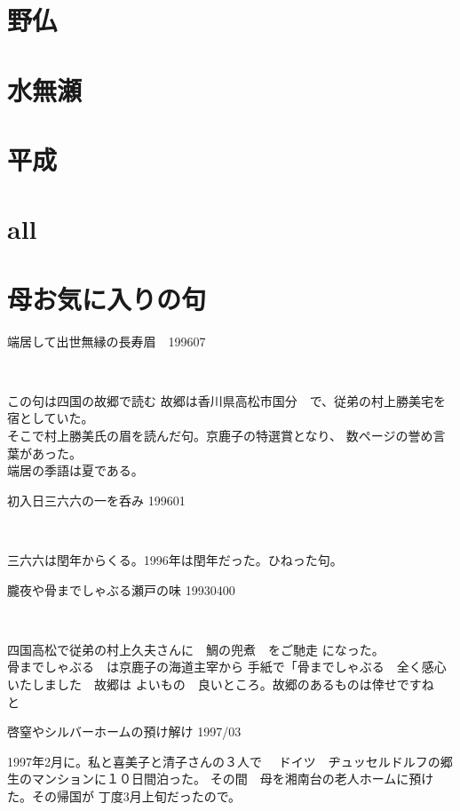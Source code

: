 \documentclass[b5paper]{tbook}
\begin{document}
\chapter{野仏}



\chapter{水無瀬}

\chapter{平成}

\vspace{0.6cm}
\chapter{all}

\chapter{母お気に入りの句}%
\begin{shiika}端居して出世無縁の長寿眉　\hfill{199607}　\end{shiika}　　　

この句は四国の故郷で読む
故郷は香川県高松市国分　で、従弟の村上勝美宅を宿としていた。
\\そこで村上勝美氏の眉を読んだ句。京鹿子の特選賞となり、
数ページの誉め言葉があった。\\端居の季語は夏である。

\vspace{5mm}
\begin{shiika}初入日三六六の一を呑み 199601　\end{shiika}　

三六六は閏年からくる。1996年は閏年だった。ひねった句。
\vspace{5mm}
\begin{shiika}朧夜や骨までしゃぶる瀬戸の味 19930400\end{shiika}　

四国高松で従弟の村上久夫さんに　鯛の兜煮　をご馳走
になった。
\\骨までしゃぶる　は京鹿子の海道主宰から
手紙で「骨までしゃぶる　全く感心いたしました　故郷は
よいもの　良いところ。故郷のあるものは倖せですね　と
\vspace{5mm}
\begin{shiika}啓窒やシルバーホームの預け解け 1997/03\end{shiika}

1997年2月に。私と喜美子と清子さんの３人で　
ドイツ　ヂュッセルドルフの郷生のマンションに１０日間泊った。
その間　母を湘南台の老人ホームに預けた。その帰国が
丁度3月上旬だったので。
\vspace{5mm}
\end{document}
